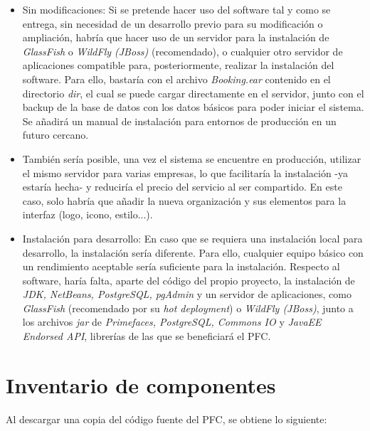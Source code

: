 \begin{itemize} 
\item Sin modificaciones: Si se pretende hacer uso del software tal y como se entrega, sin necesidad de un desarrollo previo para su modificación o ampliación, habría que hacer uso de un servidor para la instalación de \textit{GlassFish} o \textit{WildFly (JBoss)} (recomendado), o cualquier otro servidor de aplicaciones compatible para, posteriormente, realizar la instalación del software. Para ello, bastaría con el archivo \textit{Booking.ear} contenido en el directorio \textit{dir}, el cual se puede cargar directamente en el servidor, junto con el backup de la base de datos con los datos básicos para poder iniciar el sistema. Se añadirá un manual de instalación para entornos de producción en un futuro cercano. 
\item También sería posible, una vez el sistema se encuentre en producción, utilizar el mismo servidor para varias empresas, lo que facilitaría la instalación -ya estaría hecha- y reduciría el precio del servicio al ser compartido. En este caso, solo habría que añadir la nueva organización y sus elementos para la interfaz (logo, icono, estilo...). 
\item Instalación para desarrollo: En caso que se requiera una instalación local para desarrollo, la instalación sería diferente. Para ello, cualquier equipo básico con un rendimiento aceptable sería suficiente para la instalación. Respecto al software, haría falta, aparte del código del propio proyecto, la instalación de \textit{JDK, NetBeans, PostgreSQL, pgAdmin} y un servidor de aplicaciones, como \textit{GlassFish} (recomendado por su \textit{hot deployment}) o \textit{WildFly (JBoss)}, junto a los archivos \textit{jar} de \textit{Primefaces, PostgreSQL, Commons IO} y \textit{JavaEE Endorsed API}, librerías de las que se beneficiará el PFC.
\end{itemize} 


\section{Inventario de componentes}

Al descargar una copia del código fuente del PFC, se obtiene lo siguiente: 

